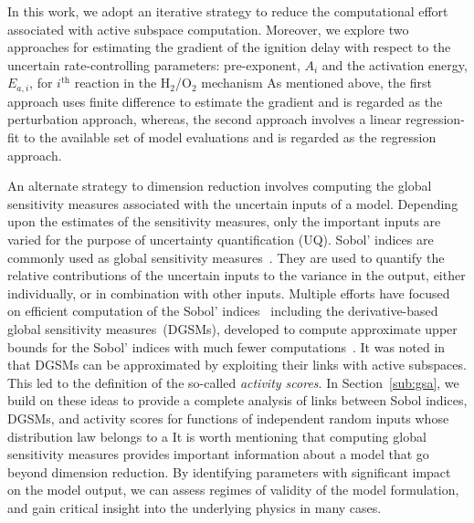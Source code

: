 In this work, we adopt an iterative strategy to reduce the computational effort
associated with active subspace computation. Moreover, we explore two approaches
for estimating the gradient of the ignition delay with respect to the uncertain
rate-controlling parameters: pre-exponent, $A_i$ and the activation energy, $E_{a,i}$,
for $i^{\text{th}}$ reaction in the H$_2$/O$_2$ mechanism 
As mentioned above, the
first approach uses finite difference to estimate the gradient and is regarded as
the perturbation approach, whereas, the second approach involves a linear
regression-fit to the available set of model evaluations and is regarded as
the regression approach. 

An alternate strategy to dimension reduction involves computing the global
sensitivity measures associated with the uncertain inputs of a model. Depending
upon the estimates of the sensitivity measures, only the important inputs are
varied for the purpose of uncertainty quantification (UQ). Sobol' indices are
commonly used as global sensitivity measures~\cite{Sobol:2001}. They are
used to quantify the relative contributions of the uncertain inputs to the variance
in the output, either individually, or in combination with other inputs. 
Multiple efforts have focused on efficient computation of the Sobol' 
indices~\cite{Sudret:2008,Plischke:2013,Tissot:2015,Li:2016} including the 
derivative-based global sensitivity measures~(DGSMs), developed to
compute approximate upper bounds for the Sobol' indices with much fewer
computations~\cite{Sobol:2009, Lamboni:2013}. It was noted
in~\cite{Diaz:2016,Constantine:2017} that DGSMs can be approximated by
exploiting their links with active subspaces. This led to the definition of the 
so-called \emph{activity scores}. In Section~\ref{sub:gsa}, we build on these
ideas to provide a complete analysis of links between Sobol indices, DGSMs, and
activity scores for functions of independent random inputs whose distribution
law belongs to a  
It is worth mentioning that computing global sensitivity measures provides 
important information about a model that go beyond dimension reduction. By 
identifying parameters with significant impact on the model output, we can assess
regimes of validity of the model formulation, and gain critical insight into the
underlying physics in many cases. 

